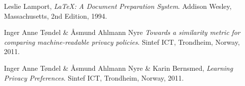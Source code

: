  


\begin{thebibliography}{99}

  Leslie Lamport,
  \emph{\LaTeX: A Document Preparation System}.
  Addison Wesley, Massachusetts,
  2nd Edition,
  1994.

Inger Anne T{\o}ndel \& {\AA}smund Ahlmann Nyre
  \emph{Towards a similarity metric for comparing machine-readable privacy policies}.
Sintef ICT, Trondheim, Norway,
  2011.

  Inger Anne T{\o}ndel \& {\AA}smund Ahlmann Nyre \& Karin Bernsmed,
  \emph{Learning Privacy Preferences}.
  Sintef ICT, Trondheim, Norway,
  2011.

\end{thebibliography}
